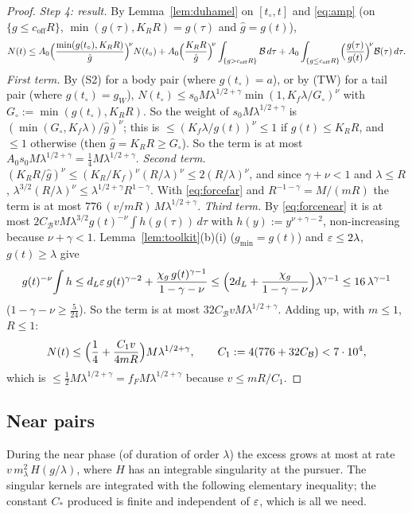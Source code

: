 \begin{proof}
\emph{Step 4: result.} By Lemma~\ref{lem:duhamel} on $[t_\circ,t]$ and \eqref{eq:amp} (on $\{g\le c_{\mathrm{off}}R\}$,
$\min(g(\tau),K_RR)=g(\tau)$ and $\hat g=g(t)$),
\[
N(t)\le A_0\Bigl(\frac{\min(g(t_\circ),K_RR)}{\hat g}\Bigr)^{\!\nu}N(t_\circ)
+A_0\Bigl(\frac{K_RR}{\hat g}\Bigr)^{\!\nu}\int_{\{g>c_{\mathrm{off}}R\}}\mathcal B\,d\tau
+A_0\int_{\{g\le c_{\mathrm{off}}R\}}\Bigl(\frac{g(\tau)}{g(t)}\Bigr)^{\!\nu}\mathcal B(\tau)\,d\tau .
\]
\emph{First term.} By (S2) for a body pair (where $g(t_\circ)=a$), or by (TW) for a tail pair (where
$g(t_\circ)=g_W$), $N(t_\circ)\le s_0M\lambda^{1/2+\gamma}\min(1,K_f\lambda/G_\circ)^\nu$ with $G_\circ:=\min(g(t_\circ),K_RR)$. So the
weight of $s_0M\lambda^{1/2+\gamma}$ is $(\min(G_\circ,K_f\lambda)/\hat g)^\nu$; this is $\le(K_f\lambda/g(t))^\nu\le1$ if
$g(t)\le K_RR$, and $\le1$ otherwise (then $\hat g=K_RR\ge G_\circ$). So the term is at most
$A_0s_0M\lambda^{1/2+\gamma}=\frac14M\lambda^{1/2+\gamma}$.
\emph{Second term.} $(K_RR/\hat g)^\nu\le(K_R/K_f)^\nu(R/\lambda)^\nu\le2(R/\lambda)^\nu$, and since $\gamma+\nu<1$ and
$\lambda\le R$, $\lambda^{3/2}(R/\lambda)^\nu\le\lambda^{1/2+\gamma}R^{1-\gamma}$. With \eqref{eq:forcefar} and
$R^{-1-\gamma}=M/(mR)$ the term is at most $776\,(v/mR)\,M\lambda^{1/2+\gamma}$.
\emph{Third term.} By \eqref{eq:forcenear} it is at most $2C_{\mathcal B} vM\lambda^{3/2}g(t)^{-\nu}\int h(g(\tau))\,d\tau$
with $h(y):=y^{\nu+\gamma-2}$, non-increasing because $\nu+\gamma<1$. Lemma~\ref{lem:toolkit}(b)(i) ($g_{\min}=g(t)$)
and $\varepsilon\le2\lambda$, $g(t)\ge\lambda$ give
\[
g(t)^{-\nu}\!\int h\le d_L\varepsilon\,g(t)^{\gamma-2}+\frac{\chi_g\,g(t)^{\gamma-1}}{1-\gamma-\nu}
\le\Bigl(2d_L+\frac{\chi_g}{1-\gamma-\nu}\Bigr)\lambda^{\gamma-1}\le16\,\lambda^{\gamma-1}
\]
($1-\gamma-\nu\ge\frac5{24}$). So the term is at most $32C_{\mathcal B} vM\lambda^{1/2+\gamma}$.
Adding up, with $m\le1$, $R\le1$:
\begin{equation}\label{eq:farfinal}
N(t)\le\Bigl(\frac14+\frac{C_1v}{4mR}\Bigr)M\lambda^{1/2+\gamma},\qquad C_1:=4(776+32C_{\mathcal B})<7\cdot10^4,
\end{equation}
which is $\le\frac12M\lambda^{1/2+\gamma}=f_FM\lambda^{1/2+\gamma}$ because $v\le mR/C_1$.
\end{proof}

\subsection{Near pairs}\label{app:walk:near}

During the near phase (of duration of order $\lambda$) the excess grows at most at rate $v\,m_\lambda^2\,H(g/\lambda)$,
where $H$ has an integrable singularity at the pursuer. The singular kernels are integrated with the following
elementary inequality; the constant $C_*$ produced is finite and independent of $\varepsilon$, which is all we need.

